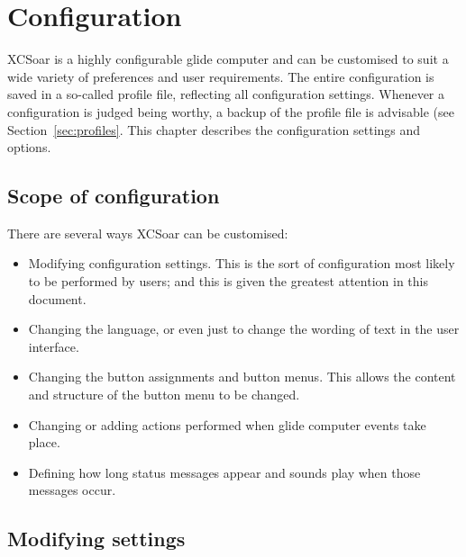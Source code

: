 \chapter{Configuration}\label{cha:configuration}\label{conf:configuration}
XCSoar is a highly configurable glide computer and can be customised
to suit a wide variety of preferences and user requirements. The entire 
configuration is saved in a so-called profile file, reflecting all 
configuration settings. Whenever a configuration is judged being worthy, a 
backup of the profile file is advisable (see Section~\ref{sec:profiles}. This
chapter describes the configuration settings and options.

\section{Scope of configuration}

There are several ways XCSoar can be customised:
\begin{itemize}

\item Modifying configuration settings.  This is the sort of configuration
  most likely to be performed by users; and this is given the greatest attention 
  in this document.
\item Changing the language, or even just to change the wording
  of text in the user interface.
\item Changing the button assignments and button menus.  This allows 
  the content and structure of the button menu to be changed. 
\item Changing or adding actions performed when glide computer events
  take place.
\item Defining how long status messages appear and sounds play
  when those messages occur.
\end{itemize}

\section{Modifying settings}

